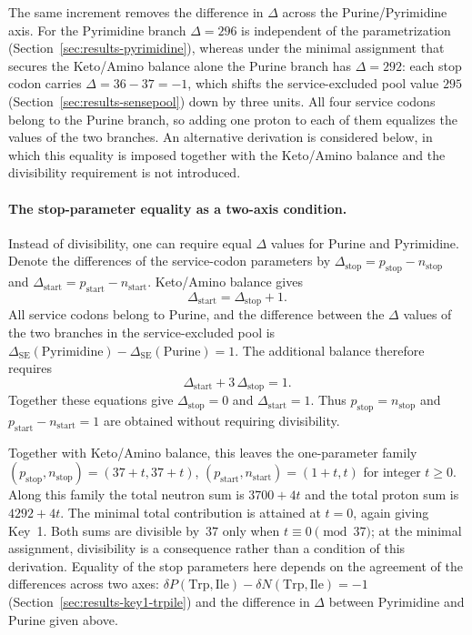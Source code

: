 \documentclass[11pt,a4paper]{article}
\renewcommand{\_}{\origunderscore\allowbreak}
\begin{document}
The same increment removes the difference in $\Delta$
across the Purine/Pyrimidine axis. For the Pyrimidine
branch $\Delta = 296$ is independent of the parametrization
(Section~\ref{sec:results-pyrimidine}), whereas under the
minimal assignment that secures the Keto/Amino balance
alone the Purine branch has $\Delta = 292$: each stop codon
carries $\Delta = 36 - 37 = -1$, which shifts the
service-excluded pool value $295$
(Section~\ref{sec:results-sensepool}) down by three units.
All four service codons belong to the Purine branch, so
adding one proton to each of them equalizes the values of
the two branches. An alternative derivation is considered
below, in which this equality is imposed together with the
Keto/Amino balance and the divisibility requirement is not
introduced.

\paragraph{The stop-parameter equality as a two-axis condition.}
Instead of divisibility, one can require equal $\Delta$
values for Purine and Pyrimidine. Denote the differences
of the service-codon parameters by
$\Delta_{\text{stop}}=p_{\text{stop}}-n_{\text{stop}}$
and $\Delta_{\text{start}}=p_{\text{start}}-n_{\text{start}}$.
Keto/Amino balance gives
\[
\Delta_{\text{start}}=\Delta_{\text{stop}}+1.
\]
All service codons belong to Purine, and the difference
between the $\Delta$ values of the two branches in the
service-excluded pool is
$\Delta_{\mathrm{SE}}(\mathrm{Pyrimidine})-
\Delta_{\mathrm{SE}}(\mathrm{Purine})=1$.
The additional balance therefore requires
\[
\Delta_{\text{start}}+3\,\Delta_{\text{stop}}=1.
\]
Together these equations give
$\Delta_{\text{stop}}=0$ and $\Delta_{\text{start}}=1$.
Thus $p_{\text{stop}}=n_{\text{stop}}$ and
$p_{\text{start}}-n_{\text{start}}=1$ are obtained
without requiring divisibility.

Together with Keto/Amino balance, this leaves the one-parameter
family $(p_{\text{stop}},n_{\text{stop}})=(37+t,37+t)$,
$(p_{\text{start}},n_{\text{start}})=(1+t,t)$ for integer $t\ge0$.
Along this family the total neutron sum is $3700+4t$
and the total proton sum is $4292+4t$. The minimal total
contribution is attained at $t=0$, again giving Key~1.
Both sums are divisible by~$37$ only when
$t\equiv0\pmod{37}$; at the minimal assignment,
divisibility is a consequence rather than a condition
of this derivation. Equality of the stop parameters here
depends on the agreement of the differences across two axes:
$\delta P(\mathrm{Trp},\mathrm{Ile})-
\delta N(\mathrm{Trp},\mathrm{Ile})=-1$
(Section~\ref{sec:results-key1-trpile}) and the difference
in $\Delta$ between Pyrimidine and Purine given above.
\end{document}

